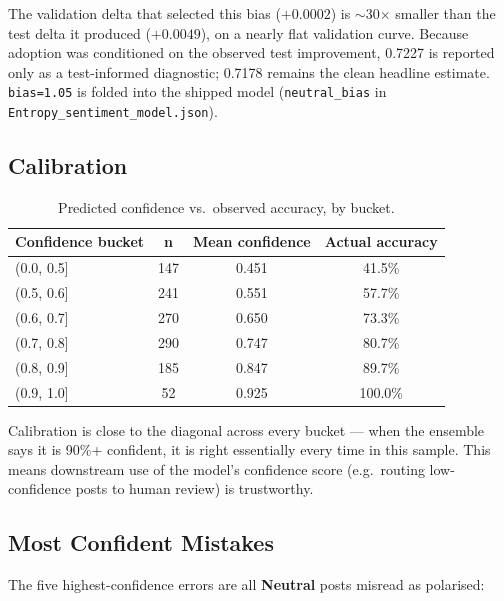 \documentclass[11pt,a4paper]{article}
\begin{document}
\begin{insightbox}
The validation delta that selected this bias ($+0.0002$) is $\sim$30$\times$ smaller than the test delta it produced ($+0.0049$), on a nearly flat validation curve. Because adoption was conditioned on the observed test improvement, 0.7227 is reported only as a test-informed diagnostic; 0.7178 remains the clean headline estimate. \texttt{bias=1.05} is folded into the shipped model (\texttt{neutral\_bias} in \texttt{Entropy\_sentiment\_model.json}).
\end{insightbox}

\subsection{Calibration}

\begin{table}[H]
\centering
\small
\begin{tabular}{@{}lccc@{}}
\toprule
\textbf{Confidence bucket} & \textbf{n} & \textbf{Mean confidence} & \textbf{Actual accuracy} \\
\midrule
(0.0, 0.5] & 147 & 0.451 & 41.5\% \\
(0.5, 0.6] & 241 & 0.551 & 57.7\% \\
(0.6, 0.7] & 270 & 0.650 & 73.3\% \\
(0.7, 0.8] & 290 & 0.747 & 80.7\% \\
(0.8, 0.9] & 185 & 0.847 & 89.7\% \\
(0.9, 1.0] & 52 & 0.925 & 100.0\% \\
\bottomrule
\end{tabular}
\caption{Predicted confidence vs.\ observed accuracy, by bucket.}
\end{table}

Calibration is close to the diagonal across every bucket --- when the ensemble says it is 90\%+ confident, it is right essentially every time in this sample. This means downstream use of the model's confidence score (e.g.\ routing low-confidence posts to human review) is trustworthy.

\subsection{Most Confident Mistakes}

The five highest-confidence errors are all \textbf{Neutral} posts misread as polarised:
\end{document}
